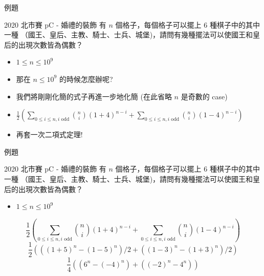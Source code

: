 \documentclass[aspectratio=169]{beamer}
\begin{document}
    \begin{frame}{例題}
        \begin{block}{2020 北市賽 pC - 婚禮的裝飾}
            有 $n$ 個格子，每個格子可以擺上 $6$ 種棋子中的其中一種 （國王、皇后、主教、騎士、士兵、城堡)，請問有幾種擺法可以使國王和皇后的出現次數皆為偶數？
            \begin{itemize}
                \item $1 \le n \le 10^9$
            \end{itemize}
        \end{block}
        \begin{itemize}
            \item<1-> 那在 $n \le 10^9$ 的時候怎麼辦呢?
            \item<2-> 我們將剛剛化簡的式子再進一步地化簡 (在此省略 $n$ 是奇數的 case)
            \item<3-> $\displaystyle \frac{1}{2}(\sum_{0 \le i \le n, i \text{ odd}} \binom{n}{i} (1+4)^{n-i} + \sum_{0 \le i \le n, i \text{ odd}} \binom{n}{i} (1-4)^{n-i})$
            \item<4-> 再套一次二項式定理!
        \end{itemize}
    \end{frame}
    
    \begin{frame}{例題}
        \begin{block}{2020 北市賽 pC - 婚禮的裝飾}
            有 $n$ 個格子，每個格子可以擺上 $6$ 種棋子中的其中一種 （國王、皇后、主教、騎士、士兵、城堡)，請問有幾種擺法可以使國王和皇后的出現次數皆為偶數？
            \begin{itemize}
                \item $1 \le n \le 10^9$
            \end{itemize}
        \end{block}
        $$\displaystyle \frac{1}{2}(\sum_{0 \le i \le n, i \text{ odd}} \binom{n}{i} (1+4)^{n-i} + \sum_{0 \le i \le n, i \text{ odd}} \binom{n}{i} (1-4)^{n-i})$$
        $$\displaystyle \frac{1}{2} (((1+5)^n - (1-5)^n)/2 + ((1-3)^n - (1+3)^n)/2)$$
        $$\displaystyle \frac{1}{4} ((6^n - (-4)^n) + ((-2)^n - 4^n))$$
    \end{frame}
    
\end{document}
